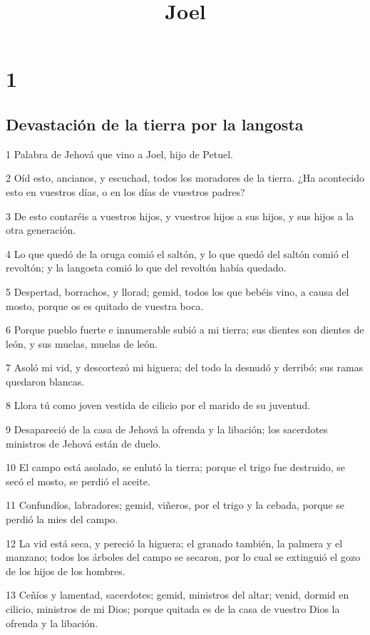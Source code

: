 

\title{Joel}

\chapter{1}

\section*{Devastación de la tierra por la langosta}

\par 1 Palabra de Jehová que vino a Joel, hijo de Petuel.
\par 2 Oíd esto, ancianos, y escuchad, todos los moradores de la tierra. ¿Ha acontecido esto en vuestros días, o en los días de vuestros padres?
\par 3 De esto contaréis a vuestros hijos, y vuestros hijos a sus hijos, y sus hijos a la otra generación.
\par 4 Lo que quedó de la oruga comió el saltón, y lo que quedó del saltón comió el revoltón; y la langosta comió lo que del revoltón había quedado.
\par 5 Despertad, borrachos, y llorad; gemid, todos los que bebéis vino, a causa del mosto, porque os es quitado de vuestra boca.
\par 6 Porque pueblo fuerte e innumerable subió a mi tierra; sus dientes son dientes de león, y sus muelas, muelas de león.
\par 7 Asoló mi vid, y descortezó mi higuera; del todo la desnudó y derribó; sus ramas quedaron blancas.
\par 8 Llora tú como joven vestida de cilicio por el marido de su juventud.
\par 9 Desapareció de la casa de Jehová la ofrenda y la libación; los sacerdotes ministros de Jehová están de duelo.
\par 10 El campo está asolado, se enlutó la tierra; porque el trigo fue destruido, se secó el mosto, se perdió el aceite.
\par 11 Confundíos, labradores; gemid, viñeros, por el trigo y la cebada, porque se perdió la mies del campo.
\par 12 La vid está seca, y pereció la higuera; el granado también, la palmera y el manzano; todos los árboles del campo se secaron, por lo cual se extinguió el gozo de los hijos de los hombres.
\par 13 Ceñíos y lamentad, sacerdotes; gemid, ministros del altar; venid, dormid en cilicio, ministros de mi Dios; porque quitada es de la casa de vuestro Dios la ofrenda y la libación.
